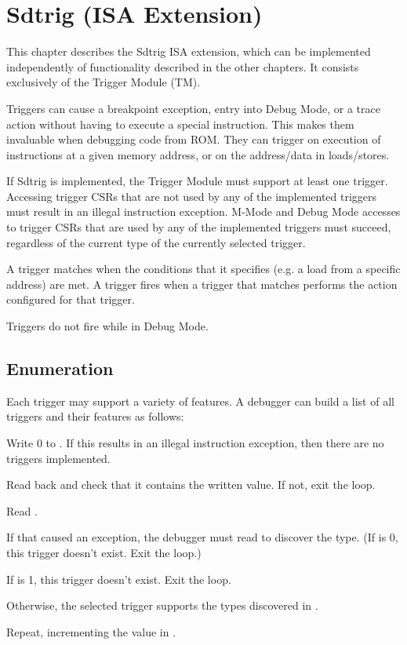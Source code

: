 \chapter{Sdtrig (ISA Extension)}
\label{sec:trigger}

This chapter describes the Sdtrig ISA extension, which can be implemented
independently of functionality described in the other chapters. It consists
exclusively of the Trigger Module (TM).

Triggers can cause a breakpoint exception, entry into Debug Mode, or a trace action
without having to execute a special instruction. This makes them invaluable
when debugging code from ROM. They can trigger on execution of instructions at
a given memory address, or on the address/data in loads/stores.

If Sdtrig is implemented, the Trigger Module must support at least one trigger.
Accessing trigger CSRs that are not used by any of the implemented triggers must
result in an illegal instruction exception. M-Mode and Debug Mode accesses to
trigger CSRs that are used by any of the implemented triggers must succeed,
regardless of the current type of the currently selected trigger.

A trigger matches when the conditions that it specifies (e.g. a load from a
specific address) are met. A trigger fires when a trigger that matches performs
the action configured for that trigger.

Triggers do not fire while in Debug Mode.

\section{Enumeration}

\begin{steps}{Each trigger may support a variety of features. A debugger can
    build a list of all triggers and their features as follows:}
\item Write 0 to \RcsrTselect. If this results in an illegal instruction
    exception, then there are no triggers implemented.
\item Read back \RcsrTselect and check that it contains the written value. If not,
    exit the loop.
\item Read \RcsrTinfo.
\item If that caused an exception, the debugger must read \RcsrTdataOne to
    discover the type. (If \FcsrTdataOneType is 0, this trigger doesn't exist. Exit the
    loop.)
\item If \FcsrTinfoInfo is 1, this trigger doesn't exist. Exit the loop.
\item Otherwise, the selected trigger supports the types discovered in \FcsrTinfoInfo.
\item Repeat, incrementing the value in \RcsrTselect.
\end{steps}

